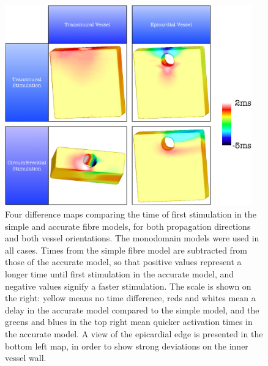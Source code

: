    \begin{figure}[htbp]
  		\centering
  	    \includegraphics[width=0.95\textwidth]{Ch4/Figs/difference_maps}
              \caption{Four difference maps comparing the time of first stimulation in the simple and accurate fibre models, for both propagation directions and both vessel orientations. The monodomain models were used in all cases. Times from the simple fibre model are subtracted from those of the accurate model, so that positive values represent a longer time until first stimulation in the accurate model, and negative values signify a faster stimulation. The scale is shown on the right: yellow means no time difference, reds and whites mean a delay in the accurate model compared to the simple model, and the greens and blues in the top right mean quicker activation times in the accurate model. A view of the epicardial edge is presented in the bottom left map, in order to show strong deviations on the inner vessel wall.}
  	  \label{fig:difference_maps}
  	\end{figure}
  	
  

